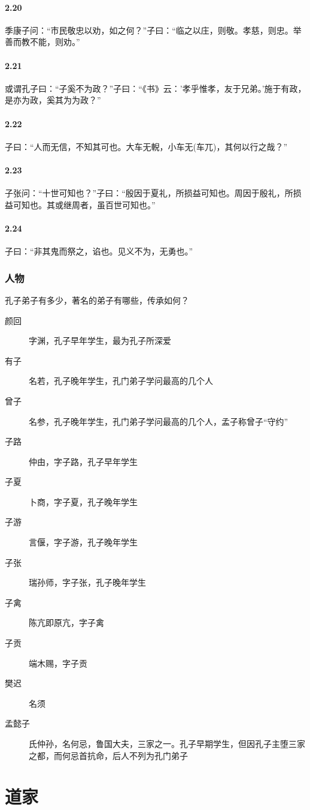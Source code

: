 \documentclass[main.tex]{subfiles}
\begin{document}
\paragraph{2.20}
季康子问：“市民敬忠以劝，如之何？”子曰：“临之以庄，则敬。孝慈，则忠。举善而教不能，则劝。”

\paragraph{2.21}
或谓孔子曰：“子奚不为政？”子曰：“《书》云：’孝乎惟孝，友于兄弟。’施于有政，是亦为政，奚其为为政？”

\paragraph{2.22}
子曰：“人而无信，不知其可也。大车无輗，小车无(车兀)，其何以行之哉？”

\paragraph{2.23}
子张问：“十世可知也？”子曰：“殷因于夏礼，所损益可知也。周因于殷礼，所损益可知也。其或继周者，虽百世可知也。”

\paragraph{2.24}
子曰：“非其鬼而祭之，谄也。见义不为，无勇也。”

\subsubsection{人物}

孔子弟子有多少，著名的弟子有哪些，传承如何？
\begin{description}
    \item[颜回] 字渊，孔子早年学生，最为孔子所深爱
    \item[有子] 名若，孔子晚年学生，孔门弟子学问最高的几个人
    \item[曾子] 名参，孔子晚年学生，孔门弟子学问最高的几个人，孟子称曾子“守约”
    \item[子路] 仲由，字子路，孔子早年学生
    \item[子夏] 卜商，字子夏，孔子晚年学生
    \item[子游] 言偃，字子游，孔子晚年学生
    \item[子张] 瑞孙师，字子张，孔子晚年学生
    \item[子禽] 陈亢即原亢，字子禽
    \item[子贡] 端木赐，字子贡
    \item[樊迟] 名须
    \item[孟懿子] 氏仲孙，名何忌，鲁国大夫，三家之一。孔子早期学生，但因孔子主堕三家之都，而何忌首抗命，后人不列为孔门弟子
\end{description}


\section{道家}
\end{document}

